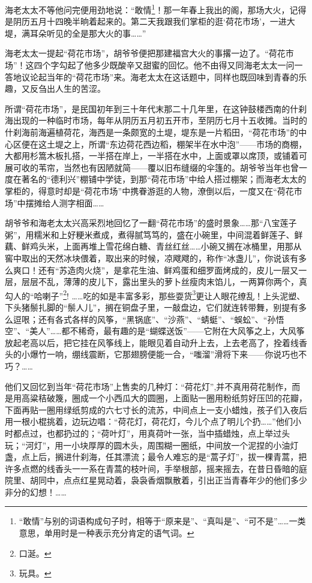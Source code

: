 \par 海老太太不等他问完便用劲地说：“敢情\footnote{“敢情”与别的词语构成句子时，相等于“原来是”、“真叫是”、“可不是”……一类意思，单用时是一种表示充分肯定的语气词。}！那一年春上我出的阁，那场大火，记得是阴历五月十四晚半晌着起来的。第二天我跟我们掌柜的逛‘荷花市场’，一进大堤，满耳朵听见的全是那大火的事……”
\par 海老太太一提起“荷花市场”，胡爷爷便把那建福宫大火的事撂一边了。“荷花市场”！这四个字勾起了他多少既酸辛又甜蜜的回忆。他不由得又同海老太太一问一答地议论起当年的“荷花市场”来。海老太太在这话题中，同样也既回味到青春的乐趣，又反刍出人生的苦涩。
\par 所谓“荷花市场”，是民国初年到三十年代末那二十几年里，在这钟鼓楼西南的什刹海出现的一种临时市场，每年从阴历五月初五开市，至阴历七月十五收摊。当时的什刹海前海遍植荷花，海西是一条颇宽的土堤，堤东是一片稻田，“荷花市场”的中心区便在这土堤之上，所谓“东边荷花西边稻，棚架半在水中泡”——市场的商棚，大都用杉篙木板扎搭，一半搭在岸上，一半搭在水中，上面或罩以席顶，或铺着可展可收的苇帘，当然也有因陋就简——覆以旧布缝缀的伞篷的。胡爷爷当年也曾一度在著名的“德利兴”棚铺中学徒，到那“荷花市场”中给人搭过棚架；而海老太太的掌柜的，得意时却是“荷花市场”中携眷游逛的人物，潦倒以后，一度又在“荷花市场”中摆摊给人测字相面……
\par 胡爷爷和海老太太兴高采烈地回忆了一翻“荷花市场”的盛时景象……那“八宝莲子粥”，用糯米和上好粳米煮成，煮得腻笃笃的，盛在小碗里，中间混着鲜莲子、鲜藕、鲜鸡头米，上面再堆上雪花绵白糖、青丝红丝……小碗又搁在冰桶里，用那从窖中取出的天然冰块偎着，取出来的时候，凉飕飕的，称作“冰盏儿”，你说该有多么爽口！还有“苏造肉火烧”，是拿花生油、鲜鸡蛋和细罗面烤成的，皮儿一层又一层，层层不乱，薄薄的皮儿下，露出里头的萝卜丝瘦肉末馅儿，一两算你两个，真勾人的“哈喇子”\footnote{口涎。}! ……吃的如是丰富多彩，那些耍货\footnote{玩具。}更让人眼花缭乱！上头泥塑、下头猪鬃扎脚的“鬃人儿”，搁在铜盘子里，一敲盘边，它们就连转带舞，别提有多么逗哏；还有各式各样的风筝，“黑锅底”、“沙燕”、“蜻蜓”、“蜈蚣”、“孙悟空”、“美人”……都不稀奇，最有趣的是“蝴蝶送饭”——它附在大风筝之上，大风筝放起老高以后，把它挂在风筝线上，能眼见着自动升上去，上去老高了，拴着线香头的小爆竹一响，绷线震断，它那翅膀便能一合，“嗤溜”滑将下来——你说巧也不巧？……
\par 他们又回忆到当年“荷花市场”上售卖的几种灯：“荷花灯”,并不真用荷花制作，而是用高粱秸破篾，圈成一个小西瓜大的圆圈，上面贴一圈用粉纸剪好压凹的花瓣，下面再贴一圈用绿纸剪成的六七寸长的流苏，中间点上一支小蜡烛，孩子们入夜后用一根小棍挑着，边玩边唱：“荷花灯，荷花灯，今儿个点了明儿个扔……”他们小时都点过，也都扔过的；“荷叶灯”，用真荷叶一张，当中插蜡烛，点上举过头玩；“河灯”，用一小块厚厚的圆木头，周围糊一圈纸，中间放一个泥捏的小油灯盏，点上后，搁进什刹海，任其漂流；最令人难忘的是“蒿子灯”，拔一棵青蒿，把许多点燃的线香头一一系在青蒿的枝叶间，手举根部，摇来摇去，在昔日昏暗的庭院里、胡同中，点点红星晃动着，袅袅香烟飘散着，引出正当青春年少的他们多少非分的幻想！……
